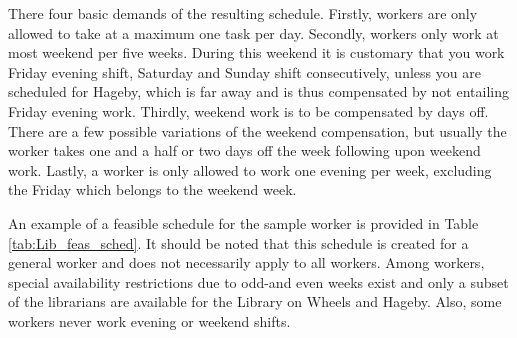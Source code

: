 There four basic demands of the resulting schedule. Firstly, workers are only allowed to take at a maximum one task per day. Secondly, workers only work at most weekend per five weeks. During this weekend it is customary that you work Friday evening shift, Saturday and Sunday shift consecutively, unless you are scheduled for Hageby, which is far away and is thus compensated by not entailing Friday evening work. Thirdly, weekend work is to be compensated by days off. There are a few possible variations of the weekend compensation, but usually the worker takes one and a half or two days off the week following upon weekend work. Lastly, a worker is only allowed to work one evening per week, excluding the Friday which belongs to the weekend week.
%
%

An example of a feasible schedule for the sample worker is provided in Table \ref{tab:Lib_feas_sched}. It should be noted that this schedule is created for a general worker and does not necessarily apply to all workers. Among workers, special availability restrictions due to odd-and even weeks exist and only a subset of the librarians are available for the Library on Wheels and Hageby. Also, some workers never work evening or weekend shifts.  

